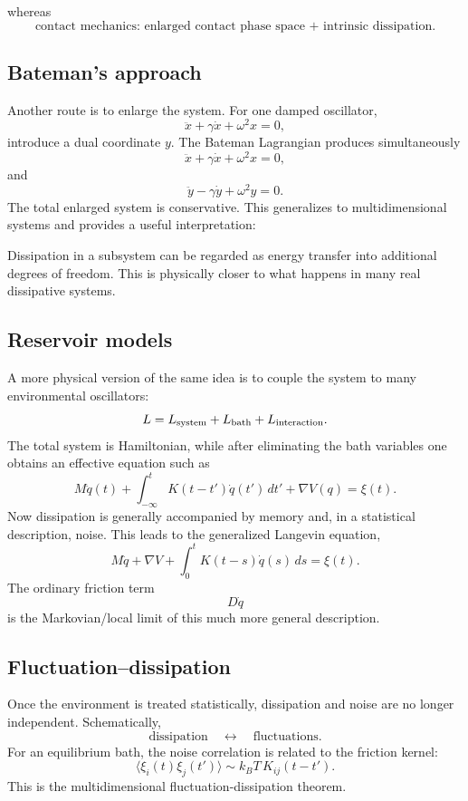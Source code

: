 
whereas
$$ \boxed{ \text{contact mechanics: enlarged contact phase space + intrinsic dissipation}. } $$

\subsection{Bateman's approach}

Another route is to enlarge the system.
For one damped oscillator,$$ \ddot x+\gamma\dot x+\omega^2x=0, $$
introduce a dual coordinate \(y\). The Bateman Lagrangian produces simultaneously
$$ \ddot x+\gamma\dot x+\omega^2x=0, $$
and
$$ \ddot y-\gamma\dot y+\omega^2y=0. $$
The total enlarged system is conservative.
This generalizes to multidimensional systems and provides a useful interpretation:

Dissipation in a subsystem can be regarded as energy transfer into additional degrees of freedom.
This is physically closer to what happens in many real dissipative systems.

\subsection{Reservoir models}

A more physical version of the same idea is to couple the system to many environmental oscillators:
$$ L=L_{\rm system}+L_{\rm bath}+L_{\rm interaction}. $$
The total system is Hamiltonian, while after eliminating the bath variables one obtains an effective equation such as
$$ M\ddot q(t) +\int_{-\infty}^t K(t-t')\dot q(t')\,dt' +\nabla V(q) =\xi(t). $$
Now dissipation is generally accompanied by memory and, in a statistical description, noise.
This leads to the generalized Langevin equation,
$$ \boxed{ M\ddot q +\nabla V +\int_0^tK(t-s)\dot q(s)\,ds =\xi(t). } $$
The ordinary friction term $$ D\dot q $$
is the Markovian/local limit of this much more general description.

\subsection{Fluctuation–dissipation}

Once the environment is treated statistically, dissipation and noise are no longer independent.
Schematically,
$$ \boxed{ \text{dissipation} \quad\leftrightarrow\quad \text{fluctuations}. } $$
For an equilibrium bath, the noise correlation is related to the friction kernel:
$$ \langle \xi_i(t)\xi_j(t')\rangle \sim k_BT\,K_{ij}(t-t'). $$
This is the multidimensional fluctuation-dissipation theorem.

